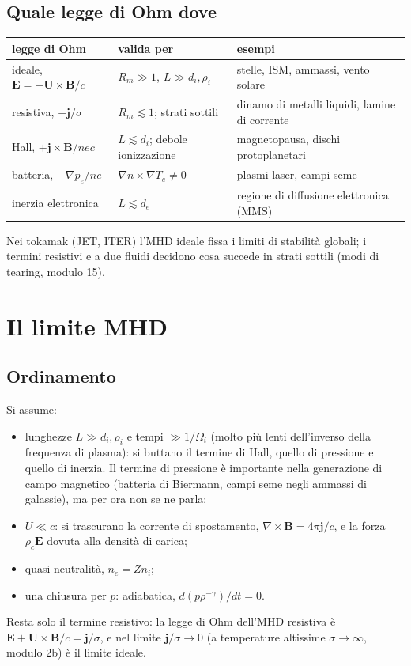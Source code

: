 \subsection{Quale legge di Ohm dove}
\begin{center}
\small
\begin{tabular}{|l|l|l|}
\hline
legge di Ohm & valida per & esempi\\
\hline
ideale, $\mathbf{E}=-\mathbf{U}\times\mathbf{B}/c$ & $R_m\gg1$, $L\gg d_i,\rho_i$ & stelle, ISM, ammassi, vento solare\\
\hline
resistiva, $+\mathbf{j}/\sigma$ & $R_m\lesssim1$; strati sottili & dinamo di metalli liquidi, lamine di corrente\\
\hline
Hall, $+\mathbf{j}\times\mathbf{B}/nec$ & $L\lesssim d_i$; debole ionizzazione & magnetopausa, dischi protoplanetari\\
\hline
batteria, $-\nabla p_e/ne$ & $\nabla n\times\nabla T_e\neq0$ & plasmi laser, campi seme\\
\hline
inerzia elettronica & $L\lesssim d_e$ & regione di diffusione elettronica (MMS)\\
\hline
\end{tabular}
\end{center}
Nei tokamak (JET, ITER) l'MHD ideale fissa i limiti di stabilità globali; i termini resistivi e a due fluidi decidono cosa succede in strati sottili (modi di tearing, modulo 15).

\section{Il limite MHD}

\subsection{Ordinamento}
Si assume:
\begin{itemize}
\item lunghezze $L\gg d_i,\rho_i$ e tempi $\gg1/\Omega_i$ (molto più lenti dell'inverso della frequenza di plasma): si buttano il termine di Hall, quello di pressione e quello di inerzia. Il termine di pressione è importante nella generazione di campo magnetico (batteria di Biermann, campi seme negli ammassi di galassie), ma per ora non se ne parla;
\item $U\ll c$: si trascurano la corrente di spostamento, $\nabla\times\mathbf{B}=4\pi\mathbf{j}/c$, e la forza $\rho_c\mathbf{E}$ dovuta alla densità di carica;
\item quasi-neutralità, $n_e=Zn_i$;
\item una chiusura per $p$: adiabatica, $d(p\rho^{-\gamma})/dt=0$.
\end{itemize}
Resta solo il termine resistivo: la legge di Ohm dell'MHD resistiva è $\mathbf{E}+\mathbf{U}\times\mathbf{B}/c=\mathbf{j}/\sigma$, e nel limite $\mathbf{j}/\sigma\to0$ (a temperature altissime $\sigma\to\infty$, modulo 2b) è il limite ideale.


